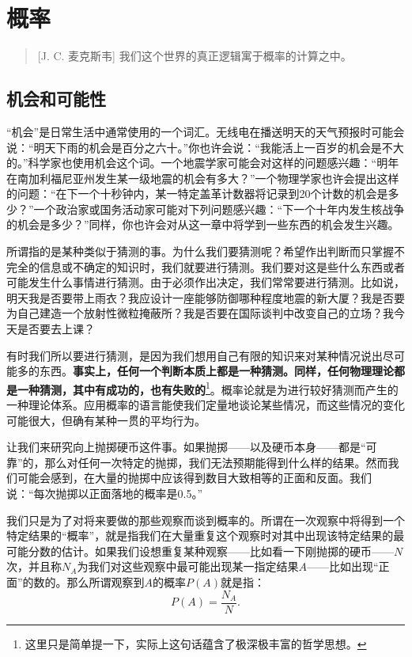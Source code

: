\chapter{概率}

\begin{quote}[J. C. 麦克斯韦]
我们这个世界的真正逻辑寓于概率的计算之中。
\end{quote}

\section{机会和可能性}

“机会”是日常生活中通常使用的一个词汇。无线电在播送明天的天气预报时可能会说：“明天下雨的机会是百分之六十。”你也许会说：“我能活上一百岁的机会是不大的。”科学家也使用机会这个词。一个地震学家可能会对这样的问题感兴趣：“明年在南加利福尼亚州发生某一级地震的机会有多大？”一个物理学家也许会提出这样的问题：“在下一个十秒钟内，某一特定盖革计数器将记录到20个计数的机会是多少？”一个政治家或国务活动家可能对下列问题感兴趣：“下一个十年内发生核战争的机会是多少？”同样，你也许会对从这一章中将学到一些东西的机会发生兴趣。

所谓指的是某种类似于猜测的事。为什么我们要猜测呢？希望作出判断而只掌握不完全的信息或不确定的知识时，我们就要进行猜测。我们要对这是些什么东西或者可能发生什么事情进行猜测。由于必须作出决定，我们常常要进行猜测。比如说，明天我是否要带上雨衣？我应设计一座能够防御哪种程度地震的新大厦？我是否要为自己建造一个放射性微粒掩蔽所？我是否要在国际谈判中改变自己的立场？我今天是否要去上课？

有时我们所以要进行猜测，是因为我们想用自己有限的知识来对某种情况说出尽可能多的东西。\textbf{事实上，任何一个判断本质上都是一种猜测。同样，任何物理理论都是一种猜测，其中有成功的，也有失败的}\footnote{这里只是简单提一下，实际上这句话蕴含了极深极丰富的哲学思想。}。概率论就是为进行较好猜测而产生的一种理论体系。应用概率的语言能使我们定量地谈论某些情况，而这些情况的变化可能很大，但确有某种一贯的平均行为。

让我们来研究向上抛掷硬币这件事。如果抛掷——以及硬币本身——都是“可靠”的，那么对任何一次特定的抛掷，我们无法预期能得到什么样的结果。然而我们可能会感到，在大量的抛掷中应该得到数目大致相等的正面和反面。我们说：“每次抛掷以正面落地的概率是0.5。”

我们只是为了对将来要做的那些观察而谈到概率的。所谓在一次观察中将得到一个特定结果的“概率”，就是指我们在大量重复这个观察时对其中出现该特定结果的最可能分数的估计。如果我们设想重复某种观察——比如看一下刚抛掷的硬币——$N$次，并且称$N_A$为我们对这些观察中最可能出现某一指定结果$A$——比如出现“正面”的数的。那么所谓观察到$A$的概率$P(A)$就是指：
\begin{equation}
\label{Eq:I:6:1}
P(A)=\frac{N_A}{N}.
\end{equation}

